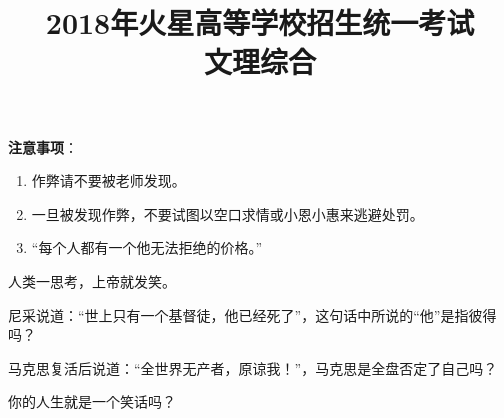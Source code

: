\documentclass[a4paper, zihao = 5, unicodeGBMath, %
]{ctexart}
\begin{document}
\title{  2018年火星高等学校招生统一考试\\ [-5pt]
   \heiti 文理综合}
\maketitle

{\bfseries \heiti 注意事项}：
\begin{enumerate}
\item 作弊请不要被老师发现。
\item 一旦被发现作弊，不要试图以空口求情或小恩小惠来逃避处罚。
\item “每个人都有一个他无法拒绝的价格。”
\end{enumerate}


\begin{qus}
  
\item 人类一思考，上帝就发笑。\dui
\item 尼采说道：“世上只有一个基督徒，他已经死了”，这句话中所说的“他”是指彼得吗？\cuo
\item 马克思复活后说道：“全世界无产者，原谅我！”，马克思是全盘否定了自己吗？\cuo
\item 你的人生就是一个笑话吗？\dui

\end{qus}

\end{document}
